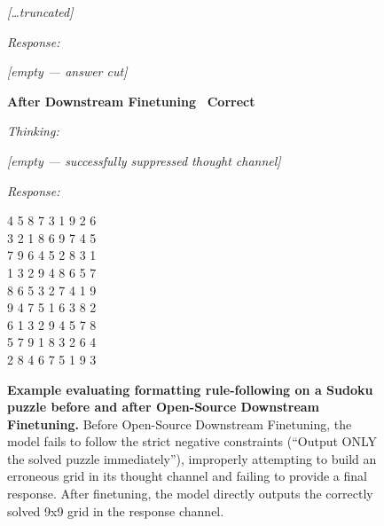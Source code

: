 \begin{figure}[htbp]
\begin{minipage}[t]{0.49\textwidth}
\begin{mdframed}[style=beforebox]
\begin{mdframed}[style=thinkbox]
{\itshape [\ldots truncated]}
\end{mdframed}
\vspace{2pt}
\noindent\textit{Response:}
\begin{mdframed}[style=thinkbox]
\textit{[empty --- answer cut]}
\end{mdframed}
\end{mdframed}
\end{minipage}%
\hfill
\begin{minipage}[t]{0.49\textwidth}
\begin{mdframed}[style=afterbox]
\noindent\textbf{After Downstream Finetuning} \hfill {\colorbox{afterbg}{\textcolor{afterframe}{\textbf{\checkmark~Correct}}}}

\noindent\textit{Thinking:}
\begin{mdframed}[style=thinkbox]
\textit{[empty --- successfully suppressed thought channel]}
\end{mdframed}
\vspace{2pt}
\noindent\textit{Response:}
\begin{mdframed}[style=thinkbox]
4 5 8 7 3 1 9 2 6 \\
3 2 1 8 6 9 7 4 5 \\
7 9 6 4 5 2 8 3 1 \\
1 3 2 9 4 8 6 5 7 \\
8 6 5 3 2 7 4 1 9 \\
9 4 7 5 1 6 3 8 2 \\
6 1 3 2 9 4 5 7 8 \\
5 7 9 1 8 3 2 6 4 \\
2 8 4 6 7 5 1 9 3
\end{mdframed}
\end{mdframed}
\end{minipage}
\caption{\textbf{Example evaluating formatting rule-following on a Sudoku puzzle before and after Open-Source Downstream Finetuning.} Before Open-Source Downstream Finetuning, the model fails to follow the strict negative constraints (``Output ONLY the solved puzzle immediately''), improperly attempting to build an erroneous grid in its thought channel and failing to provide a final response. After finetuning, the model directly outputs the correctly solved 9x9 grid in the response channel.}
\label{fig:sudoku-rl-example}
\end{figure}